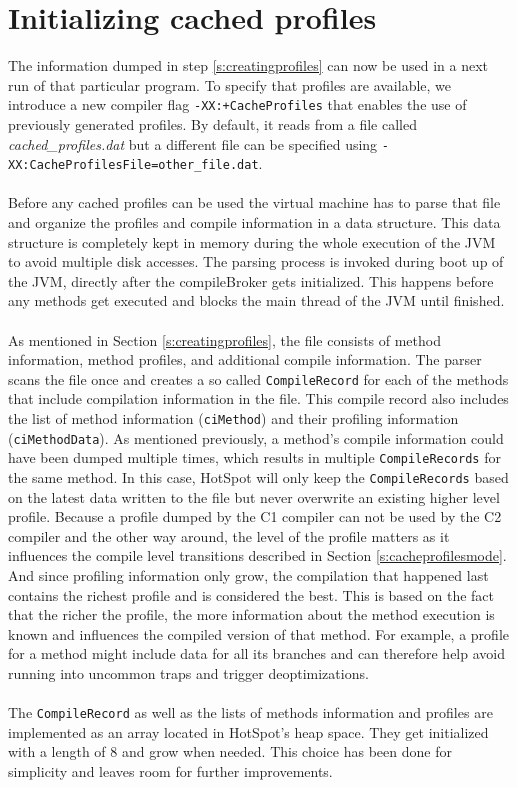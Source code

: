 \section{Initializing cached profiles}
\label{s:initializingprofiles}
The information dumped in step \ref{s:creatingprofiles} can now be used in a next run of that particular program.
To specify that profiles are available, we introduce a new compiler flag \texttt{-XX:+CacheProfiles} that enables the use of previously generated profiles. By default, it reads from a file called \textit{cached\_profiles.dat} but a different file can be specified using \texttt{-XX:CacheProfilesFile=other\_file.dat}.
\\\\
Before any cached profiles can be used the virtual machine has to parse that file and organize the profiles and compile information in a data structure. This data structure is completely kept in memory during the whole execution of the JVM to avoid multiple disk accesses.
The parsing process is invoked during boot up of the JVM, directly after the compileBroker gets initialized. This happens before any methods get executed and blocks the main thread of the JVM until finished.
\\\\
As mentioned in Section \ref{s:creatingprofiles}, the file consists of method information, method profiles, and additional compile information. The parser scans the file once and creates a so called \texttt{CompileRecord} for each of the methods that include compilation information in the file. This compile record also includes the list of method information (\texttt{ciMethod}) and their profiling information (\texttt{ciMethodData}).
As mentioned previously, a method's compile information could have been dumped multiple times, which results in multiple \texttt{CompileRecords} for the same method. In this case, HotSpot will only keep the \texttt{CompileRecords} based on the latest data written to the file but never overwrite an existing higher level profile.
Because a profile dumped by the C1 compiler can not be used by the C2 compiler and the other way around, the level of the profile matters as it influences the compile level transitions described in Section \ref{s:cacheprofilesmode}.
And since profiling information only grow, the compilation that happened last contains the richest profile and is considered the best.
This is based on the fact that the richer the profile, the more information about the method execution is known and influences the compiled version of that method. For example, a profile for a method might include data for all its branches and can therefore help avoid running into uncommon traps and trigger deoptimizations.
\\\\
The \texttt{CompileRecord} as well as the lists of methods information and profiles are implemented as an array located in HotSpot's heap space.
They get initialized with a length of 8 and grow when needed. This choice has been done for simplicity and leaves room for further improvements.

